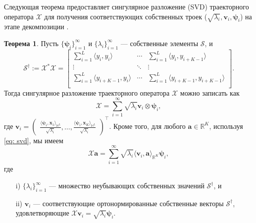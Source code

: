 \documentclass[12pt, specialist, subf
]{disser}
\theoremstyle{definition}
\newtheorem{theorem}{Теорема} %
\begin{document}
Следующая теорема предоставляет сингулярное разложение (SVD) траекторного оператора $\mathcal{X}$ для получения соответствующих собственных троек ($\sqrt{\lambda_i}, \pmb{v}_i, \pmb{\psi}_i$) на этапе декомпозиции \cite{haghbin2019functionalsingularspectrumanalysis}.
\begin{theorem}
	\label{thm:svd}
	Пусть ${\{\pmb{\psi}_i\}_{i=1}^\infty}$ и ${\{\lambda_i\}_{i=1}^\infty}$ — собственные элементы $\mathcal{S}$, и
	\begin{equation}
		\mathcal{S}^\dag:=\mathcal{X}^*\mathcal{X}=
		\begin{bmatrix}
			\sum_{i=1}^L\langle y_i, y_{i}\rangle       & \cdots & \sum_{i=1}^L\langle y_i, y_{i+K-1}\rangle       \\
			\vdots                                      & \ddots & \vdots                                          \\
			\sum_{i=1}^L\langle y_{i+K-1}, y_{i}\rangle & \cdots & \sum_{i=1}^L\langle y_{i+K-1}, y_{i+K-1}\rangle \\
		\end{bmatrix}.
	\end{equation}
	Тогда сингулярное разложение траекторного оператора $\mathcal{X}$ можно записать как
	\begin{equation}
		\label{eq: svd}
		\mathcal{X} = \sum_{i=1}^\infty \sqrt{\lambda_i}\textbf{v}_i\otimes \pmb{\psi}_i,
	\end{equation}
	где
	$\textbf{v}_i=
		\begin{pmatrix} \frac{\langle\pmb{\psi}_i, {\pmb x}_1\rangle_{\mathbb{H}^L}}{\sqrt{\lambda_i}} , \ldots,\frac{ \langle\pmb{\psi}_i, {\pmb x}_K\rangle_{\mathbb{H}^L}}{\sqrt{\lambda_i}} \end{pmatrix}^\top$. Кроме того, для любого $\pmb{a}\in\mathbb{R}^K$, используя \eqref{eq: svd}, мы имеем
	\begin{equation}
		\mathcal{X}\pmb{a} = \sum_{i=1}^\infty \sqrt{\lambda_i} \langle \textbf{v}_i, \pmb{a}\rangle_{\mathbb{R}^K} \pmb{\psi}_i,
	\end{equation}
	где
	\begin{itemize}
		\item[i)] $\{\lambda_i\}_{i=1}^\infty$ — множество неубывающих собственных значений $\mathcal{S}^\dag$, и
		\item[ii)] $\pmb{v}_i$ — соответствующие ортонормированные собственные векторы $\mathcal{S}^\dag$, удовлетворяющие $\mathcal{X}\pmb{v}_i = \sqrt{\lambda_i} \pmb{\psi}_i$.
	\end{itemize}
\end{theorem}
\end{document}

